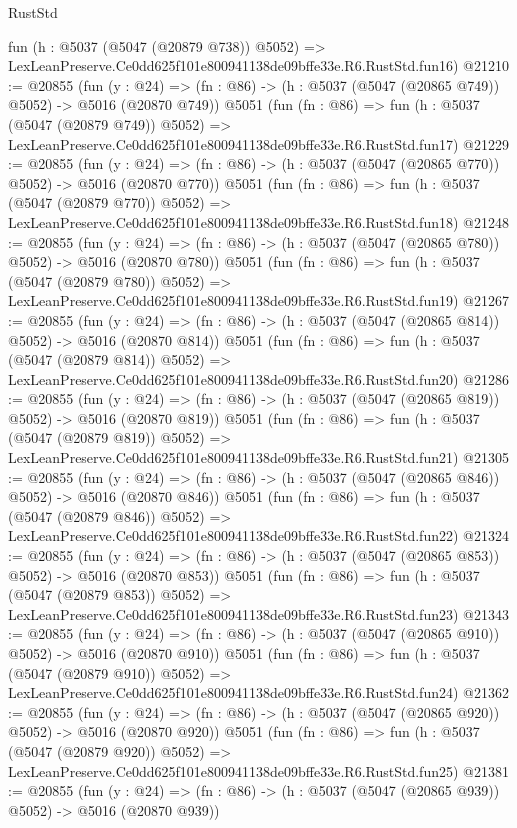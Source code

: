 \begin{lexlean}{RustStd}
\begin{coremodule}
    fun (h : @5037 (@5047 (@20879 @738)) @5052) =>
    LexLeanPreserve.Ce0dd625f101e800941138de09bffe33e.R6.RustStd.fun16)
@21210 := @20855
    (fun (y : @24) => (fn : @86) -> (h : @5037 (@5047 (@20865 @749)) @5052) -> @5016 (@20870 @749))
    @5051
    (fun (fn : @86) =>
    fun (h : @5037 (@5047 (@20879 @749)) @5052) =>
    LexLeanPreserve.Ce0dd625f101e800941138de09bffe33e.R6.RustStd.fun17)
@21229 := @20855
    (fun (y : @24) => (fn : @86) -> (h : @5037 (@5047 (@20865 @770)) @5052) -> @5016 (@20870 @770))
    @5051
    (fun (fn : @86) =>
    fun (h : @5037 (@5047 (@20879 @770)) @5052) =>
    LexLeanPreserve.Ce0dd625f101e800941138de09bffe33e.R6.RustStd.fun18)
@21248 := @20855
    (fun (y : @24) => (fn : @86) -> (h : @5037 (@5047 (@20865 @780)) @5052) -> @5016 (@20870 @780))
    @5051
    (fun (fn : @86) =>
    fun (h : @5037 (@5047 (@20879 @780)) @5052) =>
    LexLeanPreserve.Ce0dd625f101e800941138de09bffe33e.R6.RustStd.fun19)
@21267 := @20855
    (fun (y : @24) => (fn : @86) -> (h : @5037 (@5047 (@20865 @814)) @5052) -> @5016 (@20870 @814))
    @5051
    (fun (fn : @86) =>
    fun (h : @5037 (@5047 (@20879 @814)) @5052) =>
    LexLeanPreserve.Ce0dd625f101e800941138de09bffe33e.R6.RustStd.fun20)
@21286 := @20855
    (fun (y : @24) => (fn : @86) -> (h : @5037 (@5047 (@20865 @819)) @5052) -> @5016 (@20870 @819))
    @5051
    (fun (fn : @86) =>
    fun (h : @5037 (@5047 (@20879 @819)) @5052) =>
    LexLeanPreserve.Ce0dd625f101e800941138de09bffe33e.R6.RustStd.fun21)
@21305 := @20855
    (fun (y : @24) => (fn : @86) -> (h : @5037 (@5047 (@20865 @846)) @5052) -> @5016 (@20870 @846))
    @5051
    (fun (fn : @86) =>
    fun (h : @5037 (@5047 (@20879 @846)) @5052) =>
    LexLeanPreserve.Ce0dd625f101e800941138de09bffe33e.R6.RustStd.fun22)
@21324 := @20855
    (fun (y : @24) => (fn : @86) -> (h : @5037 (@5047 (@20865 @853)) @5052) -> @5016 (@20870 @853))
    @5051
    (fun (fn : @86) =>
    fun (h : @5037 (@5047 (@20879 @853)) @5052) =>
    LexLeanPreserve.Ce0dd625f101e800941138de09bffe33e.R6.RustStd.fun23)
@21343 := @20855
    (fun (y : @24) => (fn : @86) -> (h : @5037 (@5047 (@20865 @910)) @5052) -> @5016 (@20870 @910))
    @5051
    (fun (fn : @86) =>
    fun (h : @5037 (@5047 (@20879 @910)) @5052) =>
    LexLeanPreserve.Ce0dd625f101e800941138de09bffe33e.R6.RustStd.fun24)
@21362 := @20855
    (fun (y : @24) => (fn : @86) -> (h : @5037 (@5047 (@20865 @920)) @5052) -> @5016 (@20870 @920))
    @5051
    (fun (fn : @86) =>
    fun (h : @5037 (@5047 (@20879 @920)) @5052) =>
    LexLeanPreserve.Ce0dd625f101e800941138de09bffe33e.R6.RustStd.fun25)
@21381 := @20855
    (fun (y : @24) => (fn : @86) -> (h : @5037 (@5047 (@20865 @939)) @5052) -> @5016 (@20870 @939))

\end{coremodule}
\end{lexlean}
